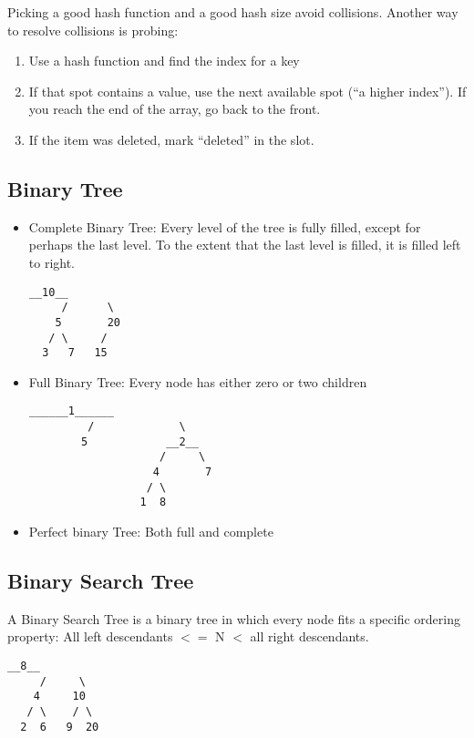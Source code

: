 \documentclass[a4paper, 11.25pt]{article}
\begin{document}
Picking a good hash function and a good hash size avoid collisions.
Another way to resolve collisions is probing:
\begin{enumerate}
    \item Use a hash function and find the index for a key
    \item If that spot contains a value, use the next available spot (``a higher index''). If you reach the end of the array, go back to the front. 
    \item If the item was deleted, mark ``deleted'' in the slot.
\end{enumerate}

\subsection{Binary Tree}
\begin{itemize}
    \item Complete Binary Tree: Every level of the tree is fully filled, except for perhaps the last level. To the extent that the last level is filled, it is filled left to right.
    \begin{lstlisting}[style=CStyle]
      __10__
     /      \
    5       20
   / \     /
  3   7   15
\end{lstlisting}
    \item Full Binary Tree: Every node has either zero or two children  
    \begin{lstlisting}[style=CStyle]
          ______1______
         /             \
        5            __2__
                    /     \
                   4       7
                  / \        
                 1  8      
\end{lstlisting}
    \item Perfect binary Tree: Both full and complete
\end{itemize}

\subsection{Binary Search Tree}
A Binary Search Tree is a binary tree in which every node fits a specific ordering property: All left descendants $<=$ N $<$ all right descendants.

\begin{lstlisting}[style=CStyle]
      __8__
     /     \
    4     10
   / \    / \
  2  6   9  20
\end{lstlisting}
\end{document}
